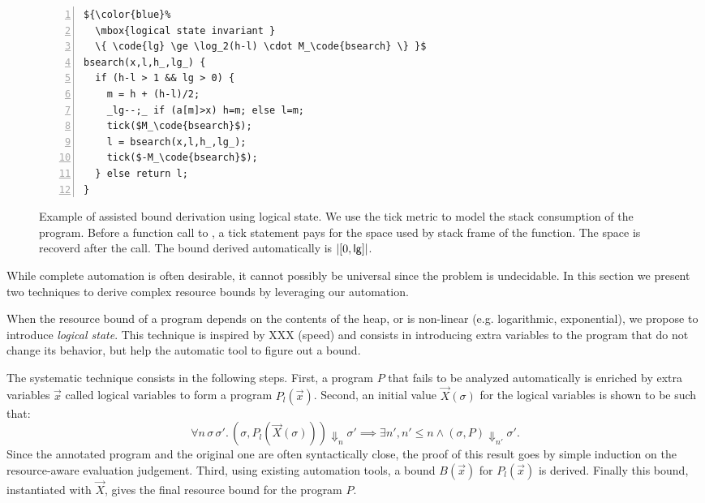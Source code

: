 \documentclass[nocopyrightspace,preprint]{sigplanconf}
\begin{document}
\begin{figure}
\begin{lstlisting}[numbers=left]
${\color{blue}%
  \mbox{logical state invariant }
  \{ \code{lg} \ge \log_2(h-l) \cdot M_\code{bsearch} \} }$
bsearch(x,l,h_,lg_) {
  if (h-l > 1 && lg > 0) {
    m = h + (h-l)/2;
    _lg--;_ if (a[m]>x) h=m; else l=m;
    tick($M_\code{bsearch}$);
    l = bsearch(x,l,h_,lg_);
    tick($-M_\code{bsearch}$);
  } else return l;
}
\end{lstlisting}
\caption{Example of assisted bound derivation using logical state.
  We use the tick metric to model the stack consumption of the program.
  Before a function call to , a tick statement pays for
  the space used by stack frame of the function.  The space is recoverd
  after the call.
  The bound derived automatically is $|[0,\mathsf{lg}]|$.
  }
\label{fig:xmplbsaux}
\end{figure}

While complete automation is often desirable, it cannot possibly
be universal since the problem is undecidable.  In this section
we present two techniques to derive complex resource bounds by
leveraging our automation.

When the resource bound of a program depends on the contents of the heap,
or is non-linear (e.g. logarithmic, exponential), we propose to
introduce \emph{logical state}.
This technique is inspired by XXX (speed) and consists in introducing
extra variables to the program that do not change its behavior, but help
the automatic tool to figure out a bound.

The systematic technique consists in the following steps. First,
a program $P$ that fails to be analyzed automatically is enriched
by extra variables $\vec x$ called logical variables to form a
program $P_l(\vec x)$.  Second, an initial value $\vec X(\sigma)$
for the logical variables is shown to be such that:
$$
\forall n\, \sigma\, \sigma'.\,
  (\sigma, P_l(\vec X(\sigma))) \Downarrow_n \sigma'
    {\implies}
  \exists n', n' \le n \land
  (\sigma, P) \Downarrow_{n'} \sigma'.
$$
Since the annotated program and the original one are often
syntactically close, the proof of this result goes
by simple induction on the resource-aware evaluation judgement.
Third, using existing automation tools, a bound $B(\vec x)$ for
$P_l(\vec x)$ is derived.  Finally this bound, instantiated with
$\vec X$, gives the final resource bound for the program $P$.
\end{document}
